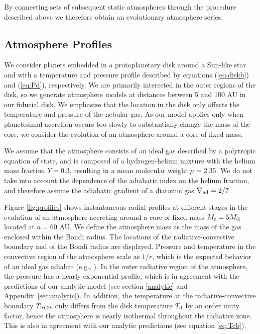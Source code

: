\documentclass[apj]{emulateapj}
\newcommand{\delad}{\nabla_{\rm ad}}
\newcommand{\App}[1]{Appendix~\ref{#1}}
\begin{document}
By connecting sets of subsequent static atmospheres through the procedure described above we therefore obtain an evolutionary atmosphere series. 

\subsection{Atmosphere Profiles}
\label{profiles}

We consider planets embedded in a protoplanetary disk around a Sun-like star and with a temperature and pressure profile described by equations (\ref{eq:diskb}) and (\ref{eq:Pd}), respectively. We are primarily interested in the outer regions of the disk, so we generate atmosphere models at distances between 5 and 100 AU in our fiducial disk. We emphasize that the location in the disk only affects the temperature and pressure of the nebular gas. As our model applies only when planetesimal accretion occurs too slowly to substantially change the mass of the core, we consider the evolution of an atmosphere around a core of fixed mass.  

We assume that the atmosphere consists of an ideal gas described by a polytropic equation of state, and is composed of a hydrogen-helium mixture with the helium mass fraction $Y=0.3$, resulting in a mean molecular weight $\mu=2.35$. We do not take into account the dependence of the adiabatic index on the helium fraction, and therefore assume the adiabatic gradient of a diatomic gas $\delad=2/7$.  %

Figure \ref{fig:profiles} shows instantaneous radial profiles at different stages in the evolution of an atmosphere accreting around a core of fixed mass $M_{\rm{c}}=5 M_{\oplus}$ located at $a=60$ AU.  We define the atmosphere mass as the mass of the gas enclosed within the Bondi radius. The locations of the radiative-convective boundary and of the Bondi radius are displayed. Pressure and temperature in the convective region of the atmosphere scale as $1/r$, which is the expected behavior of an ideal gas adiabat (e.g., \citealt{rafikov06}). In the outer radiative region of the atmosphere, the pressure has a nearly exponential profile, which is in agreement with the predictions of our analytic model (see section \ref{analytic} and \App{sec:analytic}). In addition, the temperature at the radiative-convective boundary $T_{\rm{RCB}}$ only differs from the disk temperature $T_{\rm{d}}$ by an order unity factor, hence the atmosphere is nearly isothermal throughout the radiative zone. This is also in agreement with our analytic predictions (see equation \ref{eq:Tcb}). %
\end{document}
